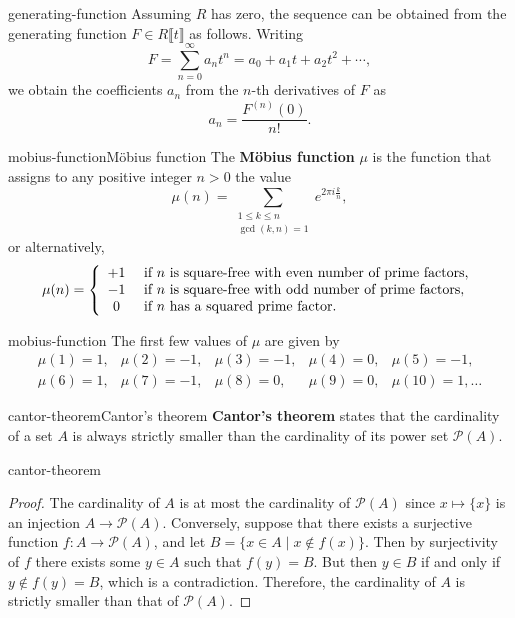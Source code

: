 \begin{example}{generating-function}
    Assuming $R$ has  zero, the sequence can be obtained from the generating function $F \in R \llbracket t \rrbracket$ as follows. Writing
    \[ F = \sum_{n = 0}^{\infty} a_n t^n = a_0 + a_1 t + a_2 t^2 + \cdots , \]
    we obtain the coefficients $a_n$ from the $n$-th derivatives of $F$ as
    \[ a_n = \frac{F^{(n)}(0)}{n!} . \]
\end{example}

\begin{topic}{mobius-function}{Möbius function}
    The \textbf{Möbius function} $\mu$ is the function that assigns to any positive integer $n > 0$ the value
    \[ \mu(n) = \sum_{\substack{1 \le k \le n \\ \gcd(k, n) = 1}} e^{2\pi i \frac{k}{n}} , \]
    or alternatively,
    \[ \mu(n) = \left\{ \begin{array}{cl}
         +1 & \textup{ if $n$ is square-free with even number of prime factors}, \\
         -1 & \textup{ if $n$ is square-free with odd number of prime factors}, \\
         0 & \textup{ if $n$ has a squared prime factor}.
    \end{array} \right. \]
\end{topic}

\begin{example}{mobius-function}
    The first few values of $\mu$ are given by
    \[ \begin{array}{lllll}
        \mu(1) = 1, & \mu(2) = -1, & \mu(3) = -1, & \mu(4) = 0, & \mu(5) = -1, \\
        \mu(6) = 1, & \mu(7) = -1, & \mu(8) = 0, & \mu(9) = 0, & \mu(10) = 1, \ldots
    \end{array} \]
\end{example}

\begin{topic}{cantor-theorem}{Cantor's theorem}
    \textbf{Cantor's theorem} states that the cardinality of a set $A$ is always strictly smaller than the cardinality of its power set $\mathcal{P}(A)$.
\end{topic}

\begin{example}{cantor-theorem}
    \begin{proof}
        The cardinality of $A$ is at most the cardinality of $\mathcal{P}(A)$ since $x \mapsto \{ x \}$ is an injection $A \to \mathcal{P}(A)$.
        Conversely, suppose that there exists a surjective function $f : A \to \mathcal{P}(A)$, and let $B = \{ x \in A \mid x \not\in f(x) \}$. Then by surjectivity of $f$ there exists some $y \in A$ such that $f(y) = B$. But then $y \in B$ if and only if $y \not\in f(y) = B$, which is a contradiction. Therefore, the cardinality of $A$ is strictly smaller than that of $\mathcal{P}(A)$.
    \end{proof}
\end{example}

